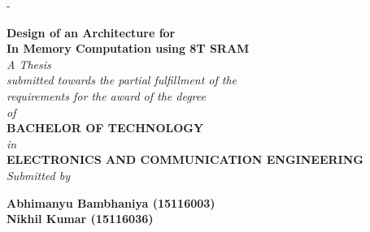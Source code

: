 \begin{titlingpage}
\begin{SingleSpace}
\calccentering{\unitlength}
\begin{adjustwidth*}{\unitlength}{-\unitlength}
\vspace*{-1.5 cm}
\begin{center}
{\LARGE \textbf{Design of an Architecture for\\ In Memory Computation using 8T SRAM}}
\vspace{1mm}
{\Large \textbf{}}\\[4mm]
\vspace{0.5 cm}
{\large \emph{A Thesis\\ submitted towards the partial fulfillment of the\\ \vspace{1 mm} requirements for the award of the degree \\ \vspace{1 mm} of}}\\
\vspace{5 mm}
{\large \textbf{BACHELOR OF TECHNOLOGY} \vspace{3 mm} \\\emph{in}\\\vspace{3 mm} \textbf{ELECTRONICS AND COMMUNICATION ENGINEERING}}\\
\vspace{4 mm}
\vspace{2 mm}
{\large \emph{Submitted by}}\\
\vspace{5mm}

\begin{minipage}[t]{0.8\textwidth}
\begin{center} \large
{\large\textbf{Abhimanyu Bambhaniya (15116003)}}\\
{\large\textbf{Nikhil Kumar (15116036)}}\\
\end{center}
\end{minipage}


\end{center}
\end{adjustwidth*}
\end{SingleSpace}
\end{titlingpage}
